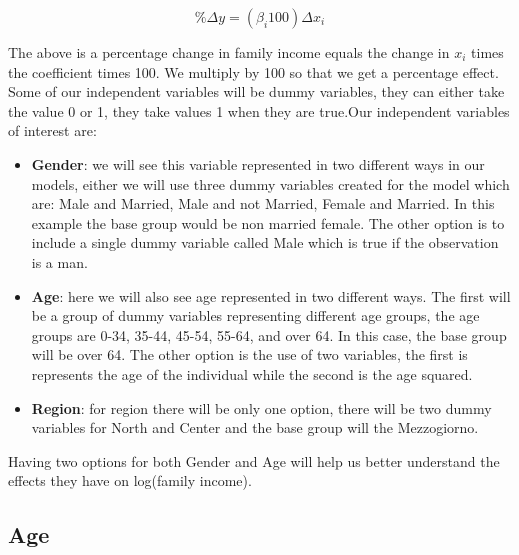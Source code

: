 \documentclass[12pt]{article}
\begin{document}
\begin{spacing}{1.5}
\begin{equation}
	\% \Delta y = ({\beta}_{i} 100) \Delta {x}_{i}
\end{equation}

The above is a percentage change in family income equals the change in $ x_i $ times the coefficient times 100. We multiply by 100 so that we get a percentage effect. Some of our independent variables will be dummy variables, they can either take the value 0 or 1, they take values 1 when they are true.Our independent variables of interest are:

\begin{itemize}
	\item \textbf{Gender}: we will see this variable represented in two different ways in our models, either we will use three dummy variables created for the model which are: Male and Married, Male and not Married, Female and Married. In this example the base group would be non married female. The other option is to include a single dummy variable called Male which is true if the observation is a man.
	\item \textbf{Age}: here we will also see age represented in two different ways. The first will be a group of dummy variables representing different age groups, the age groups are 0-34, 35-44, 45-54, 55-64, and over 64. In this case, the base group will be over 64. The other option is the use of two variables, the first is represents the age of the individual while the second is the age squared.
	\item \textbf{Region}: for region there will be only one option, there will be two dummy variables for North and Center and the base group will the Mezzogiorno.
\end{itemize}

Having two options for both Gender and Age will help us better understand the effects they have on log(family income).

\end{spacing}

\subsection{Age}
\end{document}
